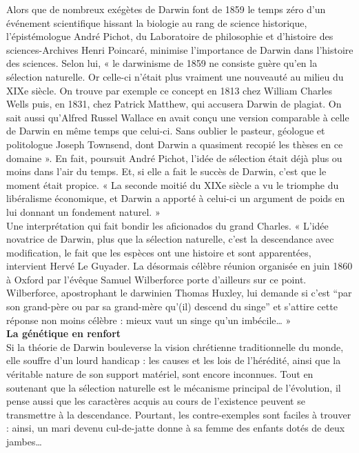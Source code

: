 \documentclass[8pt]{article}
\begin{document}
Alors que de nombreux exégètes de Darwin font de 1859 le temps zéro d’un événement scientifique hissant la biologie au rang de science historique, l’épistémologue André Pichot, du Laboratoire de philosophie et d’histoire des sciences-Archives Henri Poincaré, minimise l’importance de Darwin dans l’histoire des sciences. Selon lui, « le darwinisme de 1859 ne consiste guère qu’en la sélection naturelle. Or celle-ci n’était plus vraiment une nouveauté au milieu du XIXe siècle. On trouve par exemple ce concept en 1813 chez William Charles Wells puis, en 1831, chez Patrick Matthew, qui accusera Darwin de plagiat. On sait aussi qu’Alfred Russel Wallace en avait conçu une version comparable à celle de Darwin en même temps que celui-ci. Sans oublier le pasteur, géologue et politologue Joseph Townsend, dont Darwin a quasiment recopié les thèses en ce domaine ». En fait, poursuit André Pichot, l’idée de sélection était déjà plus ou moins dans l’air du temps. Et, si elle a fait le succès de Darwin, c’est que le moment était propice. « La seconde moitié du XIXe siècle a vu le triomphe du libéralisme économique, et Darwin a apporté à celui-ci un argument de poids en lui donnant un fondement naturel. »\\

Une interprétation qui fait bondir les aficionados du grand Charles. « L’idée novatrice de Darwin, plus que la sélection naturelle, c’est la descendance avec modification, le fait que les espèces ont une histoire et sont apparentées, intervient Hervé Le Guyader. La désormais célèbre réunion organisée en juin 1860 à Oxford par l’évêque Samuel Wilberforce porte d’ailleurs sur ce point. Wilberforce, apostrophant le darwinien Thomas Huxley, lui demande si c’est “par son grand-père ou par sa grand-mère qu’(il) descend du singe” et s’attire cette réponse non moins célèbre : mieux vaut un singe qu’un imbécile… »\\

\textbf{La génétique en renfort}\\

Si la théorie de Darwin bouleverse la vision chrétienne traditionnelle du monde, elle souffre d’un lourd handicap : les causes et les lois de l’hérédité, ainsi que la véritable nature de son support matériel, sont encore inconnues. Tout en soutenant que la sélection naturelle est le mécanisme principal de l’évolution, il pense aussi que les caractères acquis au cours de l’existence peuvent se transmettre à la descendance. Pourtant, les contre-exemples sont faciles à trouver : ainsi, un mari devenu cul-de-jatte donne à sa femme des enfants dotés de deux jambes…\\
\end{document}
